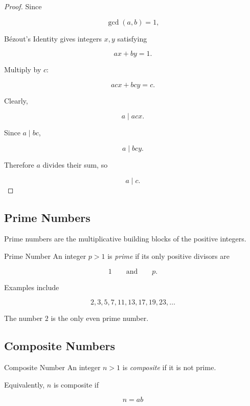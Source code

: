 \begin{proof}
Since

\[ \gcd(a,b)=1, \]

Bézout's Identity gives integers \(x,y\) satisfying

\[ ax+by=1. \]

Multiply by \(c\):

\[ acx+bcy=c. \]

Clearly,

\[ a\mid acx. \]

Since \(a\mid bc\),

\[ a\mid bcy. \]

Therefore \(a\) divides their sum, so

\[ a\mid c. \]
\end{proof}

\subsection{Prime Numbers}
\label{subsec:prime-numbers}

Prime numbers are the multiplicative building blocks of the positive
integers.

\begin{definitionbox}{Prime Number}
An integer \(p>1\) is \emph{prime} if its only positive divisors are

\[ 1\qquad\text{and}\qquad p. \]
\end{definitionbox}

Examples include

\[ 2,3,5,7,11,13,17,19,23,\ldots \]

The number \(2\) is the only even prime number.

\subsection{Composite Numbers}
\label{subsec:composite-numbers}

\begin{definitionbox}{Composite Number}
An integer \(n>1\) is \emph{composite} if it is not prime.
\end{definitionbox}

Equivalently, \(n\) is composite if

\[ n=ab \]


